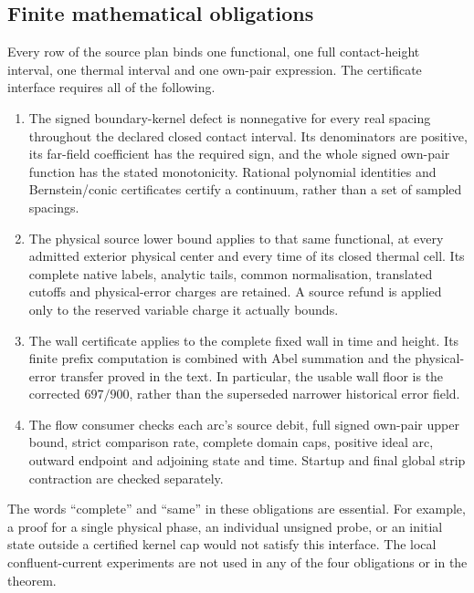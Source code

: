 \documentclass[11pt,a4paper]{article}
\theoremstyle{definition}
\theoremstyle{remark}
\begin{document}
\subsection{Finite mathematical obligations}\label{ver:obligations}

Every row of the source plan binds one functional, one full contact-height
interval, one thermal interval and one own-pair expression.  The certificate
interface requires all of the following.
\begin{enumerate}
\item The signed boundary-kernel defect is nonnegative for every real
spacing throughout the declared closed contact interval.  Its denominators
are positive, its far-field coefficient has the required sign, and the whole
signed own-pair function has the stated monotonicity.  Rational polynomial
identities and Bernstein/conic certificates certify a continuum, rather than
a set of sampled spacings.
\item The physical source lower bound applies to that same functional, at
every admitted exterior physical center and every time of its closed thermal
cell.  Its complete native labels, analytic tails, common normalisation,
translated cutoffs and physical-error charges are retained.  A source refund
is applied only to the reserved variable charge it actually bounds.
\item The wall certificate applies to the complete fixed wall in time and
height.  Its finite prefix computation is combined with Abel summation and
the physical-error transfer proved in the text.  In particular, the usable
wall floor is the corrected $697/900$, rather than the superseded narrower
historical error field.
\item The flow consumer checks each arc's source debit, full signed own-pair
upper bound, strict comparison rate, complete domain caps, positive ideal
arc, outward endpoint and adjoining state and time.  Startup and final
global strip contraction are checked separately.
\end{enumerate}
The words ``complete'' and ``same'' in these obligations are essential.
For example, a proof for a single physical phase, an individual unsigned
probe, or an initial state outside a certified kernel cap would not satisfy
this interface.  The local confluent-current experiments are not used in
any of the four obligations or in the theorem.
\end{document}
